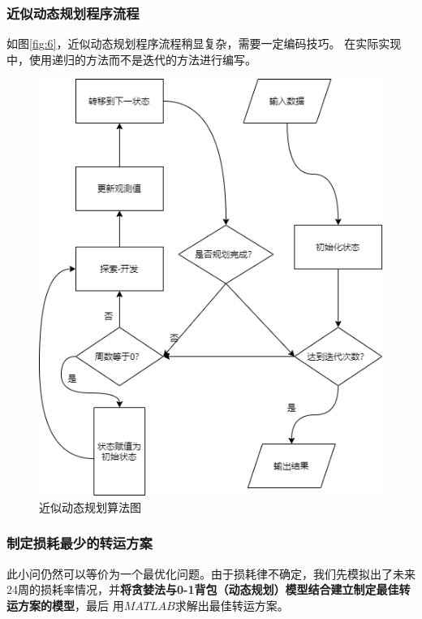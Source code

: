 \documentclass{cumcmthesis}
\begin{document}
\subsubsection*{近似动态规划程序流程}
如图\ref{fig:6}，近似动态规划程序流程稍显复杂，需要一定编码技巧。
在实际实现中，使用递归的方法而不是迭代的方法进行编写。
\begin{figure}[H]
    \centering
    \includegraphics[scale = 0.5]{GH.png}
    \centering
    \caption{近似动态规划算法图} \label{fig:5}
\end{figure}


\subsubsection{制定损耗最少的转运方案}
此小问仍然可以等价为一个最优化问题。由于损耗律不确定，我们先模拟出了未来24周的损耗率情况，并\textbf{将贪婪法与0-1背包（动态规划）模型结合建立制定最佳转运方案的模型}，最后
用$MATLAB$求解出最佳转运方案。
\end{document}
